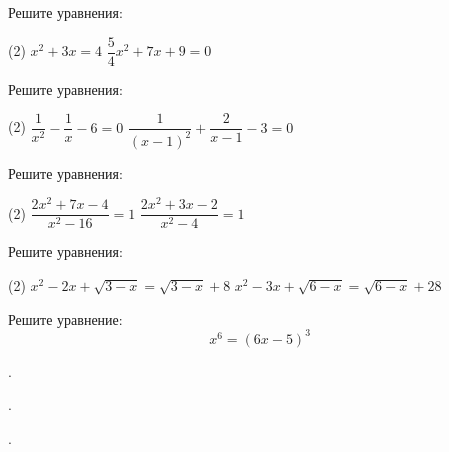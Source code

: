 %
%

\begin{class}[number=1]
	\begin{listofex}
		\item Решите уравнения:
		\begin{tasks}(2)
			\task \( x^2+3x=4 \)
			\task \( \dfrac{5}{4}x^2+7x+9=0 \)
		\end{tasks}
		\item Решите уравнения:
		\begin{tasks}(2)
			\task \( \dfrac{1}{x^2}-\dfrac{1}{x}-6=0 \)
			\task \( \dfrac{1}{(x-1)^2}+\dfrac{2}{x-1}-3=0 \)
		\end{tasks}
		\item Решите уравнения:
		\begin{tasks}(2)
			\task \( \dfrac{2x^2+7x-4}{x^2-16}=1 \)
			\task \( \dfrac{2x^2+3x-2}{x^2-4}=1 \)
		\end{tasks}
		\item Решите уравнения:
		\begin{tasks}(2)
			\task \( x^2-2x+\sqrt{3-x}=\sqrt{3-x}+8 \)
			\task \( x^2-3x+\sqrt{6-x}=\sqrt{6-x}+28 \)
		\end{tasks}
		\item Решите уравнение:
		\[x^6=(6x-5)^3\]
	\end{listofex}
\end{class}

\begin{class}[number=2]
	\begin{listofex}
	\item .
	\end{listofex}
\end{class}

\begin{homework}[number=1]
	\begin{listofex}
		\item.
	\end{listofex}
\end{homework}

\begin{class}[number=3]
	\begin{listofex}
		\item .
	\end{listofex}
\end{class}

